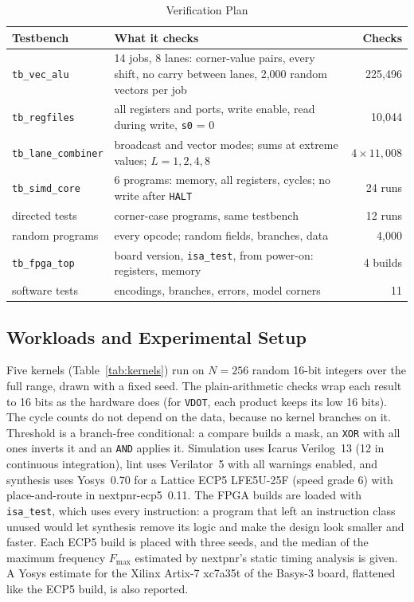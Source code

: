 \documentclass[journal]{IEEEtran}
\begin{document}
\begin{table}[t]
\centering
\caption{Verification Plan}
\label{tab:verif}
\footnotesize
\setlength{\tabcolsep}{4pt}
\renewcommand{\arraystretch}{1.12}
\begin{tabular}{lL{0.45\columnwidth}r}
\toprule
Testbench & What it checks & Checks \\
\midrule
\texttt{tb\_vec\_alu}       & 14 jobs, 8 lanes: corner-value pairs, every shift, no carry between lanes, 2,000 random vectors per job & 225,496 \\
\texttt{tb\_regfiles}       & all registers and ports, write enable, read during write, \texttt{s0} = 0 & 10,044 \\
\texttt{tb\_lane\_combiner} & broadcast and vector modes; sums at extreme values; $L = 1, 2, 4, 8$ & $4 \times 11{,}008$ \\
\texttt{tb\_simd\_core}     & 6 programs: memory, all registers, cycles; no write after \texttt{HALT} & 24 runs \\
directed tests              & corner-case programs, same testbench & 12 runs \\
random programs             & every opcode; random fields, branches, data & 4,000 \\
\texttt{tb\_fpga\_top}      & board version, \texttt{isa\_test}, from power-on: registers, memory & 4 builds \\
software tests              & encodings, branches, errors, model corners & 11 \\
\bottomrule
\end{tabular}
\end{table}

\subsection{Workloads and Experimental Setup}
Five kernels (Table~\ref{tab:kernels}) run on $N = 256$ random 16-bit integers over the
full range, drawn with a fixed seed. The plain-arithmetic checks wrap each result to 16
bits as the hardware does (for \texttt{VDOT}, each product keeps its low 16 bits). The
cycle counts do not depend on the data, because no kernel branches on it. Threshold is a branch-free conditional: a compare builds a mask, an
\texttt{XOR} with all ones inverts it and an \texttt{AND} applies it. Simulation uses
Icarus Verilog~13 (12 in continuous integration), lint uses Verilator~5 with all
warnings enabled, and synthesis uses
Yosys~0.70 for a Lattice ECP5 LFE5U-25F (speed grade 6) with place-and-route in
nextpnr-ecp5~0.11. The FPGA builds are loaded with \texttt{isa\_test}, which uses every instruction: a
program that left an instruction class unused would let synthesis remove its logic and
make the design look smaller and faster. Each ECP5 build is placed with three seeds,
and the median of the maximum frequency $F_{\max}$ estimated by nextpnr's static
timing analysis is given. A Yosys estimate for the Xilinx Artix-7 xc7a35t of the
Basys-3 board, flattened like the ECP5 build, is also reported.
\end{document}
